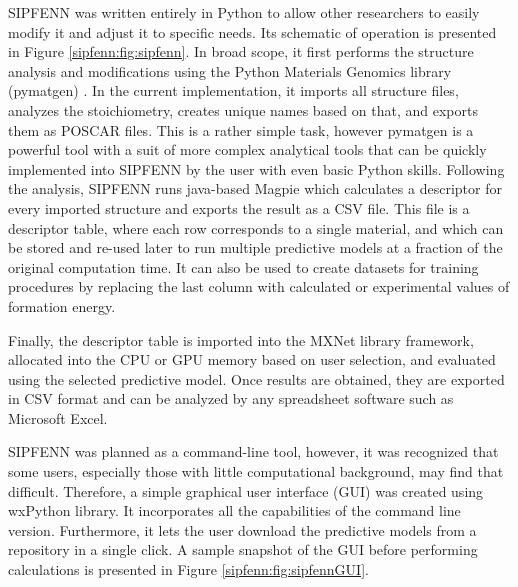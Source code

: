 SIPFENN was written entirely in Python to allow other researchers to easily modify it and adjust it to specific needs. Its schematic of operation is presented in Figure \ref{sipfenn:fig:sipfenn}. In broad scope, it first performs the structure analysis and modifications using the Python Materials Genomics library (pymatgen) \cite{Ong2013PythonAnalysis}. In the current implementation, it imports all structure files, analyzes the stoichiometry, creates unique names based on that, and exports them as POSCAR files. This is a rather simple task, however pymatgen is a powerful tool with a suit of more complex analytical tools that can be quickly implemented into SIPFENN by the user with even basic Python skills. Following the analysis, SIPFENN runs java-based Magpie \cite{Ward2016AMaterials} which calculates a descriptor for every imported structure and exports the result as a CSV file. This file is a descriptor table, where each row corresponds to a single material, and which can be stored and re-used later to run multiple predictive models at a fraction of the original computation time. It can also be used to create datasets for training procedures by replacing the last column with calculated or experimental values of formation energy.

Finally, the descriptor table is imported into the MXNet library framework, allocated into the CPU or GPU memory based on user selection, and evaluated using the selected predictive model. Once results are obtained, they are exported in CSV format and can be analyzed by any spreadsheet software such as Microsoft Excel.

SIPFENN was planned as a command-line tool, however, it was recognized that some users, especially those with little computational background, may find that difficult. Therefore, a simple graphical user interface (GUI) was created using wxPython library. It incorporates all the capabilities of the command line version. Furthermore, it lets the user download the predictive models from a repository in a single click. A sample snapshot of the GUI before performing calculations is presented in Figure \ref{sipfenn:fig:sipfennGUI}.

